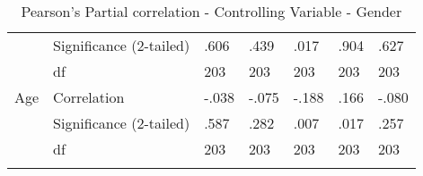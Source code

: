 \documentclass{llncs}
\begin{document}
\begin{table}[]
\begin{tabular}{@{}lllllll@{}}
                  & Significance (2-tailed) & .606  & .439    & .017  & .904  & .627    \\
                  & df                      & 203   & 203     & 203   & 203   & 203     \\
Age               & Correlation             & -.038 & -.075   & -.188 & .166  & -.080   \\
                  & Significance (2-tailed) & .587  & .282    & .007  & .017  & .257    \\
                  & df                      & 203   & 203     & 203   & 203   & 203     \\
                  &                         &       &         &       &       &         \\ \bottomrule
\end{tabular}
\caption{Pearson's Partial correlation - Controlling Variable - Gender }
\label{tbl: PearControllingGender}
\end{table}
\end{document}
